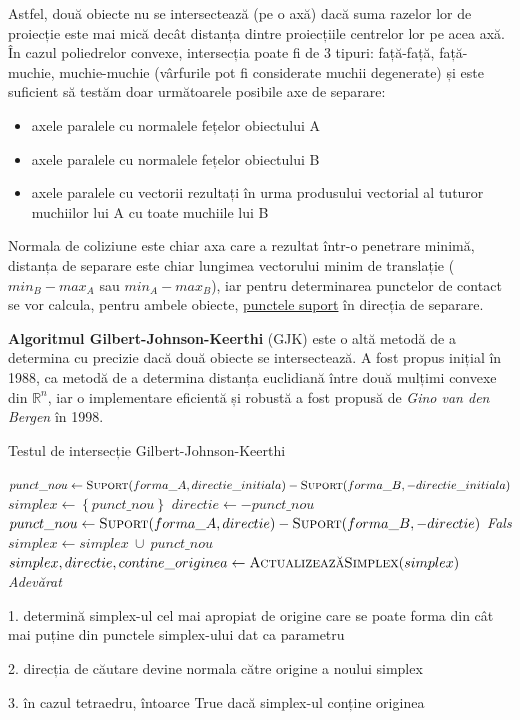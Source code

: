 \documentclass[12pt,a4paper]{report}
\begin{document}
Astfel, două obiecte nu se intersectează (pe o axă) dacă suma razelor lor de proiecție este mai mică decât distanța dintre proiecțiile centrelor lor pe acea axă. În cazul poliedrelor convexe, intersecția poate fi de 3 tipuri: față-față, față-muchie, muchie-muchie (vârfurile pot fi considerate muchii degenerate) și este suficient să testăm doar următoarele posibile axe de separare:
\begin{itemize}
	\item axele paralele cu normalele fețelor obiectului A
	\item axele paralele cu normalele fețelor obiectului B
	\item axele paralele cu vectorii rezultați în urma produsului vectorial al tuturor muchiilor lui A cu toate muchiile lui B
\end{itemize}
Normala de coliziune este chiar axa care a rezultat într-o penetrare minimă, distanța de separare este chiar lungimea vectorului minim de translație ($min_B - max_A$ sau $min_A - max_B$), iar pentru determinarea punctelor de contact se vor calcula, pentru ambele obiecte, \hyperref[support_points]{punctele suport} în direcția de separare.


\textbf{Algoritmul Gilbert-Johnson-Keerthi} (GJK) este o altă metodă de a determina cu precizie dacă două obiecte se intersectează. A fost propus inițial în 1988\cite{gjk_original}, ca metodă de a determina distanța euclidiană între două mulțimi convexe din $\mathbb{R}^n$, iar o implementare eficientă și robustă a fost propusă de \textit{Gino van den Bergen} în 1998\cite{gjk_gino}.

\begin{algorithm}[H]
	\footnotesize
	\linespread{0.9}\selectfont
	\caption{Testul de intersecție Gilbert-Johnson-Keerthi}
	\label{gjk_intersection_test}
	\begin{algorithmic}[0]
			\State $punct\_nou \gets \textproc{Suport}(forma\_A, directie\_initiala) - \textproc{Suport}(forma\_B, -directie\_initiala)$
			\State $simplex \gets \left\lbrace punct\_nou \right\rbrace $
			\State $directie \gets -punct\_nou$
			\Loop
				\State $punct\_nou \gets \textproc{Suport}(forma\_A, directie) - \textproc{Suport}(forma\_B, -directie)$
					\State \Return \textit{Fals}
				\EndIf
				\State $simplex \gets simplex\ \cup\ punct\_nou $
				\State $simplex, directie, contine\_originea \gets \textproc{ActualizeazăSimplex}(simplex) $
					\State \Return \textit{Adevărat}
				\EndIf
			\EndLoop
		\EndFunction
		\Statex
			
			1. determină simplex-ul cel mai apropiat de origine care se poate forma din cât mai puține din punctele simplex-ului dat ca parametru
			
			2. direcția de căutare devine normala către origine a noului simplex
			
			3. în cazul tetraedru, întoarce True dacă simplex-ul conține originea
		\EndFunction
	\end{algorithmic}
\end{algorithm}
\end{document}
